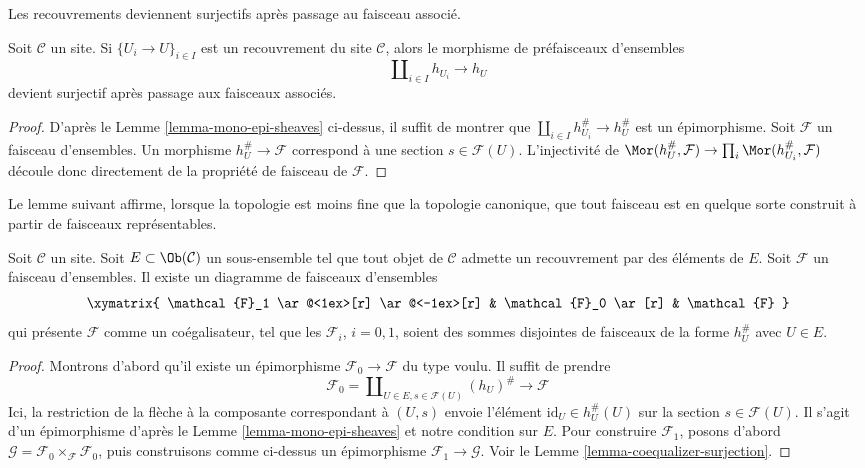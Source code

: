 \begin{lemma}
\label{lemma-covering-surjective-after-sheafification}
\begin{slogan}
Les recouvrements deviennent surjectifs après passage au faisceau associé.
\end{slogan}
Soit $\mathcal{C}$ un site. Si
$\{U_i \to U\}_{i \in I}$ est un recouvrement du site
$\mathcal{C}$, alors le morphisme de préfaisceaux d’ensembles
$$
\coprod\nolimits_{i \in I} h_{U_i} \to h_U
$$
devient surjectif après passage aux faisceaux associés.
\end{lemma}

\begin{proof}
D’après le Lemme \ref{lemma-mono-epi-sheaves} ci-dessus, il suffit de montrer que
$\coprod\nolimits_{i \in I} h_{U_i}^\# \to h_U^\#$
est un épimorphisme. Soit $\mathcal{F}$ un faisceau d’ensembles.
Un morphisme $h_U^\# \to \mathcal{F}$
correspond à une section $s \in \mathcal{F}(U)$.
L’injectivité de $\Mor(h_U^\#, \mathcal{F})
\to \prod_i \Mor(h_{U_i}^\#, \mathcal{F})$ découle donc
directement de la propriété de faisceau de $\mathcal{F}$.
\end{proof}

\noindent
Le lemme suivant affirme, lorsque la topologie est moins fine que la
topologie canonique, que tout faisceau est en quelque sorte construit à partir de
faisceaux représentables.

\begin{lemma}
\label{lemma-sheaf-coequalizer-representable}
Soit $\mathcal{C}$ un site. Soit $E \subset \Ob(\mathcal{C})$ un
sous-ensemble tel que tout objet de $\mathcal{C}$ admette un recouvrement par
des éléments de $E$. Soit $\mathcal{F}$ un faisceau d’ensembles. Il existe un
diagramme de faisceaux d’ensembles
$$
\xymatrix{
\mathcal{F}_1 \ar@<1ex>[r] \ar@<-1ex>[r] &
\mathcal{F}_0 \ar[r] &
\mathcal{F}
}
$$
qui présente $\mathcal{F}$ comme un coégalisateur,
tel que les $\mathcal{F}_i$, $i = 0, 1$, soient des sommes disjointes
de faisceaux de la forme $h_U^\#$ avec $U \in E$.
\end{lemma}

\begin{proof}
Montrons d’abord qu’il existe un épimorphisme $\mathcal{F}_0 \to \mathcal{F}$
du type voulu. Il suffit de prendre
$$
\mathcal{F}_0 =
\coprod\nolimits_{U \in E, s \in \mathcal{F}(U)}
(h_U)^\# \longrightarrow \mathcal{F}
$$
Ici, la restriction de la flèche à la composante correspondant à $(U, s)$ envoie
l’élément $\text{id}_U \in h_U^\#(U)$ sur la section $s \in \mathcal{F}(U)$.
Il s’agit d’un épimorphisme d’après le Lemme \ref{lemma-mono-epi-sheaves} et
notre condition sur $E$. Pour construire $\mathcal{F}_1$, posons d’abord
$\mathcal{G} = \mathcal{F}_0 \times_\mathcal{F} \mathcal{F}_0$, puis
construisons comme ci-dessus un épimorphisme $\mathcal{F}_1 \to \mathcal{G}$.
Voir le Lemme \ref{lemma-coequalizer-surjection}.
\end{proof}

